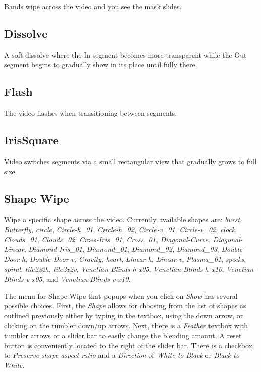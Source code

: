 Bands wipe across the video and you see the mask slides.

\subsection*{Dissolve}%
\label{sub:dissolve}

A soft dissolve where the In segment becomes more transparent while the Out segment begins to gradually show in its place until fully there.

\subsection*{Flash}%
\label{sub:flash}

The video flashes when transitioning between segments.

\subsection*{IrisSquare}%
\label{sub:irissquare}

Video switches segments via a small rectangular view that gradually grows to full size.

\subsection*{Shape Wipe}%
\label{sub:shape_wipe}

Wipe a specific shape across the video. Currently available shapes are: \textit{burst}, \textit{Butterfly},
 \textit{circle}, \textit{Circle-h\_01}, \textit{Circle-h\_02}, \textit{Circle-v\_01}, \textit{Circle-v\_02},
 \textit{clock}, \textit{Clouds\_01}, \textit{Clouds\_02}, \textit{Cross-Iris\_01}, \textit{Cross\_01},
\textit{Diagonal-Curve}, \textit{Diagonal-Linear}, \textit{Diamond-Iris\_01}, \textit{Diamond\_01},
 \textit{Diamond\_02}, \textit{Diamond\_03}, \textit{Double-Door-h}, \textit{Double-Door-v}, \textit{Gravity},
\textit{heart}, \textit{Linear-h}, \textit{Linear-v}, \textit{Plasma\_01}, 
 \textit{specks}, \textit{spiral}, \textit{tile2x2h}, \textit{tile2x2v}, \textit{Venetian-Blinds-h-x05},
 \textit{Venetian-Blinds-h-x10}, \textit{Venetian-Blinds-v-x05}, and \textit{Venetian-Blinds-v-x10}. 

The menu for Shape Wipe that popups when you click on \textit{Show} has several possible choices.  First, the \textit{Shape} allows for choosing from the list of shapes as outlined previously either by typing in the textbox, using the down arrow, or clicking on the tumbler down/up arrows.
Next, there is a \textit{Feather} textbox with tumbler arrows or a slider bar to easily change the blending amount.  A reset button is conveniently located to the right of the slider bar.  There is a checkbox to \textit{Preserve shape aspect ratio} and a \textit{Direction} of \textit{White to Black} or \textit{Black to White}.


